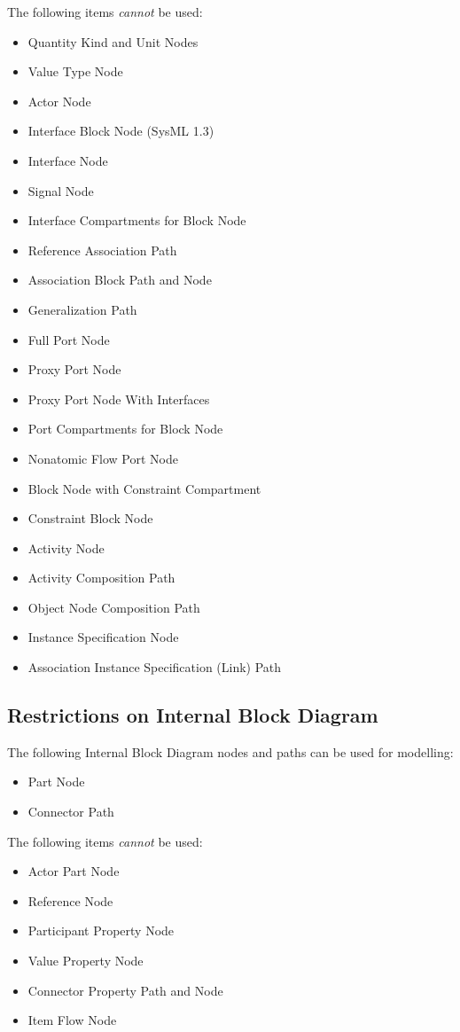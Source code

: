 The following items \emph{cannot} be used:
\begin{itemize}
\item Quantity Kind and Unit Nodes
\item Value Type Node
\item Actor Node
\item Interface Block Node (SysML 1.3)
\item Interface Node
\item Signal Node
\item Interface Compartments for Block Node
\item Reference Association Path
\item Association Block Path and Node
\item Generalization Path
\item Full Port Node
\item Proxy Port Node
\item Proxy Port Node With Interfaces
\item Port Compartments for Block Node
\item Nonatomic Flow Port Node
\item Block Node with Constraint Compartment
\item Constraint Block Node
\item Activity Node
\item Activity Composition Path
\item Object Node Composition Path
\item Instance Specification Node
\item Association Instance Specification (Link) Path
\end{itemize}

\subsection{Restrictions on Internal Block Diagram}

The following Internal Block Diagram nodes and paths can be used for
modelling:
\begin{itemize}
\item Part Node
\item Connector Path
\end{itemize}

The following items \emph{cannot} be used:
\begin{itemize}
\item Actor Part Node
\item Reference Node
\item Participant Property Node
\item Value Property Node
\item Connector Property Path and Node
\item Item Flow Node
\end{itemize}

